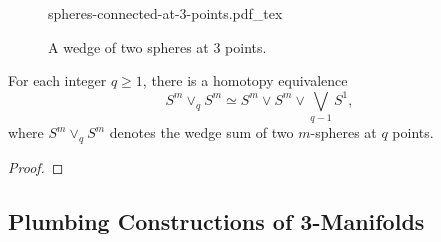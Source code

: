 \begin{remark}
\end{remark}

\begin{figure}[ht]
	\centering
	{spheres-connected-at-3-points.pdf_tex}
	\caption{A wedge of two spheres at $3$ points.}
\end{figure}

\begin{proposition}
	For each integer $q\geq 1$, there is a homotopy equivalence
	\[
		S^m\vee_q S^m \simeq S^m\vee S^m \vee \bigvee_{q-1} S^1,
	\]
	where $S^m\vee_q S^m$ denotes the wedge sum of two $m$-spheres at $q$ points.
\end{proposition}

\begin{proof}
\end{proof}

\subsection*{Plumbing Constructions of 3-Manifolds}
